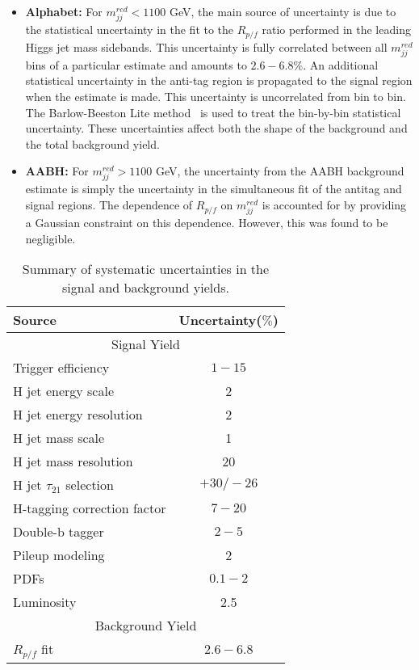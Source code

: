 \begin{itemize}

\item \textbf{Alphabet:} For $m_{jj}^{red} < 1100$ GeV, the main source of uncertainty is due to the statistical uncertainty in the fit to the $R_{p/f}$ ratio performed in the leading Higgs jet mass sidebands. This uncertainty is fully correlated between all $m_{jj}^{red}$ bins of a particular estimate and amounts to $2.6-6.8\%$. An additional statistical uncertainty in the anti-tag region is propagated to the signal region when the estimate is made. This uncertainty is uncorrelated from bin to bin. The Barlow-Beeston Lite method~\cite{Barlow} is used to treat the bin-by-bin statistical uncertainty. These uncertainties affect both the shape of the background and the total background yield.

\item \textbf{AABH:} For $m_{jj}^{red} > 1100$ GeV, the uncertainty from the AABH background estimate is simply the uncertainty in the simultaneous fit of the antitag and signal regions. The dependence of $R_{p/f}$ on $m_{jj}^{red}$ is accounted for by providing a Gaussian constraint on this dependence. However, this was found to be negligible.

\end{itemize}

\begin{table}[htb]
\begin{center}
    \begin{tabular}{l c}
    \hline
    \hline
    Source &  Uncertainty($\%$) \\
    \hline
    \multicolumn{2}{c}{Signal Yield}\\
    Trigger efficiency & $1-15$\\
    H jet energy scale & 2 \\
    H jet energy resolution & 2 \\
    H jet mass scale & 1 \\
    H jet mass resolution & 20 \\
    H jet $\tau_{21}$ selection & $+30/-26$ \\
    H-tagging correction factor & $7-20$\\
    Double-b tagger & $2-5$ \\
    Pileup modeling & 2 \\
    PDFs & $0.1-2$ \\
    Luminosity & 2.5 \\
    \multicolumn{2}{c}{Background Yield}\\
    $R_{p/f}$ fit & $2.6-6.8$ \\
    \hline
    \hline
    \end{tabular}
    \caption{Summary of systematic uncertainties in the signal and background yields. \label{tab:SysUnc}}
\end{center}
\end{table}



